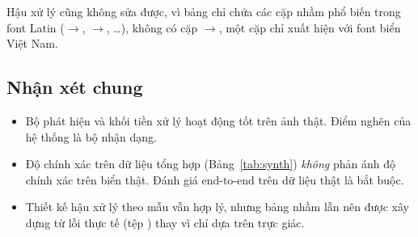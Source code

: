 Hậu xử lý cũng không sửa được, vì bảng  chỉ chứa các cặp nhầm phổ biến trong font Latin ($\to$, $\to$, \ldots), không có cặp $\to$, một cặp chỉ xuất hiện với font biển Việt Nam.

\subsection{Nhận xét chung}
\begin{itemize}[nosep]
  \item Bộ phát hiện và khối tiền xử lý hoạt động tốt trên ảnh thật. Điểm nghẽn của hệ thống là bộ nhận dạng.
  \item Độ chính xác trên dữ liệu tổng hợp (Bảng~\ref{tab:synth}) \emph{không} phản ánh độ chính xác trên biển thật. Đánh giá end-to-end trên dữ liệu thật là bắt buộc.
  \item Thiết kế hậu xử lý theo mẫu vẫn hợp lý, nhưng bảng nhầm lẫn nên được xây dựng từ lỗi thực tế (tệp ) thay vì chỉ dựa trên trực giác.
\end{itemize}
